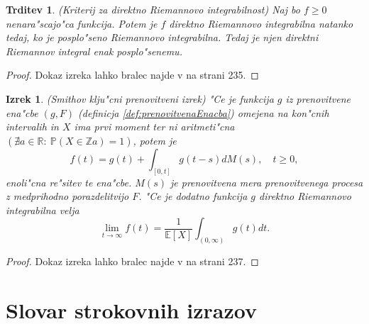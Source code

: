 \documentclass[12pt, a4paper, reqno]{amsart}
\theoremstyle{definition}
\theoremstyle{plain}
\newtheorem{izrek}[definicija]{Izrek}
\newtheorem{trditev}[definicija]{Trditev}
\newcommand{\R}{\mathbb{R}}
\newcommand{\E}{\mathbb{E}}
\newcommand{\Prob}{\mathbb{P}}
\newcommand{\1}{\mathds{1}}
\begin{document}
    \begin{trditev}(Kriterij za direktno Riemannovo integrabilnost)
        Naj bo $f \geq 0$ nenara"scajo"ca funkcija. Potem je $f$ direktno Riemannovo integrabilna natanko tedaj, ko je
        posplo"seno Riemannovo integrabilna. Tedaj je njen direktni Riemannov integral enak posplo"senemu.
        \label{trd:kriterijZaDirektnoRiemannovoIntegrabilnost}
    \end{trditev}

    \begin{proof}
        Dokaz izreka lahko bralec najde v \cite{8} na strani 235. 
    \end{proof} 

    \begin{izrek}(Smithov klju"cni prenovitveni izrek)
        "Ce je funkcija $g$ iz prenovitvene ena"cbe $(g, F)$ (definicja \ref{def:prenovitvenaEnacba})
        omejena na kon"cnih intervalih in $X$ ima prvi moment ter ni aritmeti"cna 
        $(\nexists a\in\R: \ \Prob\left(X \in \mathbb{Z} a\right) = 1)$, potem je
        \begin{equation*}
            f(t) = g(t) +  \int_{[0, t]}g(t - s)dM(s), \quad t\geq 0,
        \end{equation*}
        enoli"cna re"sitev te ena"cbe. $M(s)$ je prenovitvena mera prenovitvenega procesa z medprihodno 
        porazdelitvijo $F$.
        "Ce je dodatno funkcija $g$ direktno Riemannovo integrabilna velja 
        \begin{equation*}
            \lim_{t\to\infty}f(t) = \frac{1}{\E\left[X\right]}\int_{(0, \infty)}g(t)dt.
        \end{equation*}
        \label{izr:Smith}
    \end{izrek}

    \begin{proof}
        Dokaz izreka lahko bralec najde v \cite{8} na strani 237. 
    \end{proof}


\pagebreak
\section*{Slovar strokovnih izrazov}
\end{document}
